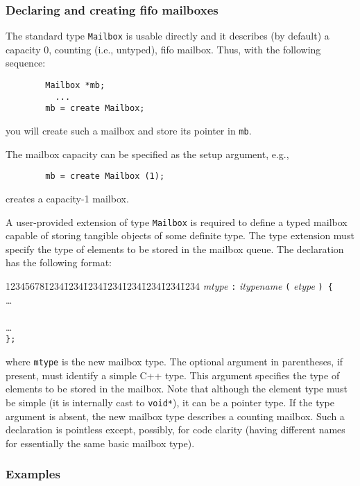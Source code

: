 \subsubsection{Declaring and creating fifo mailboxes}
\label{rm_mb_fi_dc}

The standard type {\tt Mailbox} is usable directly and it describes
(by default) a capacity 0, counting (i.e., untyped), fifo mailbox.
Thus, with the following sequence:

\begin{verbatim}
        Mailbox *mb;
          ...
        mb = create Mailbox;
\end{verbatim}
you will create such a mailbox and store its pointer in {\tt mb}.

The mailbox capacity can be specified as the setup argument, e.g.,
\begin{verbatim}
        mb = create Mailbox (1);
\end{verbatim}
creates a capacity-1 mailbox.

A user-provided extension of type {\tt Mailbox} is required to define
a typed mailbox capable of storing tangible objects of some definite type.
The type extension must specify the type of elements to be stored in
the mailbox queue.
The declaration has the following format:

{\tt\begin{tabbing}
12345678\=1234\=1234\=1234\=1234\=1234\=1234\=1234\=1234\kill
{} {\em mtype\/} {\tt :} {\em itypename\/} {\tt (} {\em etype\/} {\tt ) \{} \\
\> \>\ldots \\
\>  \\
\> \>\ldots \\
\> {\tt \};}
\end{tabbing}}
where {\tt mtype} is the new mailbox type.
The optional argument in parentheses,
if present, must identify a simple C++ type.
This argument specifies the type of elements to be stored in the mailbox.
Note that although the element type must be simple (it is internally cast to
{\tt void*}), it can be a pointer type.
If the type argument is absent, the new mailbox type describes a counting
mailbox.
Such a declaration is pointless except, possibly, for code clarity
(having different names for essentially the same basic mailbox type).

\subsubsection*{Examples}

